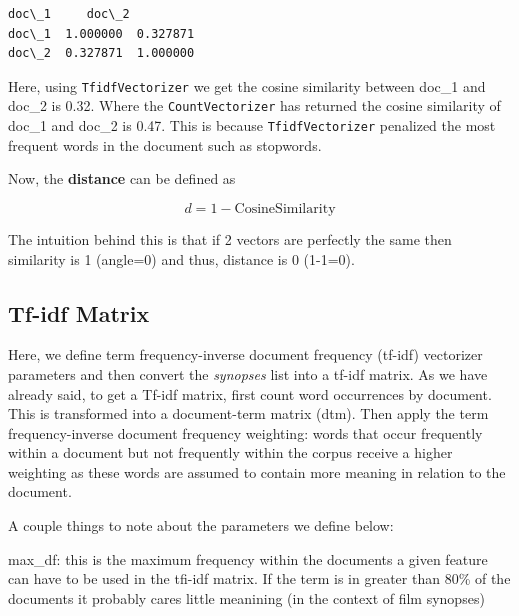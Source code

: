 \documentclass[11pt]{article}
\makeatletter
\newcommand{\boxspacing}{\kern\kvtcb@left@rule\kern\kvtcb@boxsep}
\newcommand{\prompt}[4]{
        {\ttfamily\llap{{\color{#2}[#3]:\hspace{3pt}#4}}\vspace{-\baselineskip}}
    }
\makeatother
\begin{document}
            \begin{tcolorbox}[breakable, size=fbox, boxrule=.5pt, pad at break*=1mm, opacityfill=0]
\prompt{Out}{outcolor}{75}{\boxspacing}
\begin{Verbatim}[commandchars=\\\{\}]
          doc\_1     doc\_2
doc\_1  1.000000  0.327871
doc\_2  0.327871  1.000000
\end{Verbatim}
\end{tcolorbox}
        
    Here, using \texttt{TfidfVectorizer} we get the cosine similarity
between doc\_1 and doc\_2 is 0.32. Where the \texttt{CountVectorizer}
has returned the cosine similarity of doc\_1 and doc\_2 is 0.47. This is
because \texttt{TfidfVectorizer} penalized the most frequent words in
the document such as stopwords.

    Now, the \textbf{distance} can be defined as

\begin{equation}
d =1-\mathrm{CosineSimilarity} 
\end{equation}

The intuition behind this is that if 2 vectors are perfectly the same
then similarity is 1 (angle=0) and thus, distance is 0 (1-1=0).

    \hypertarget{tf-idf-matrix}{%
\subsection{Tf-idf Matrix}\label{tf-idf-matrix}}

    Here, we define term frequency-inverse document frequency (tf-idf)
vectorizer parameters and then convert the \emph{synopses} list into a
tf-idf matrix. As we have already said, to get a Tf-idf matrix, first
count word occurrences by document. This is transformed into a
document-term matrix (dtm). Then apply the term frequency-inverse
document frequency weighting: words that occur frequently within a
document but not frequently within the corpus receive a higher weighting
as these words are assumed to contain more meaning in relation to the
document.

A couple things to note about the parameters we define below:

max\_df: this is the maximum frequency within the documents a given
feature can have to be used in the tfi-idf matrix. If the term is in
greater than 80\% of the documents it probably cares little meanining
(in the context of film synopses)
\end{document}
